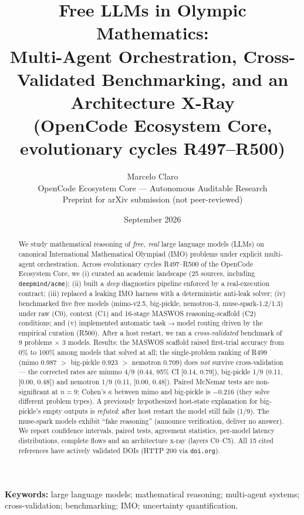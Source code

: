 \documentclass[11pt,letterpaper]{article}
\title{\bfseries Free LLMs in Olympic Mathematics:\\ Multi-Agent Orchestration, Cross-Validated Benchmarking, and an Architecture X-Ray\\
\large (OpenCode Ecosystem Core, evolutionary cycles R497--R500)}
\author{Marcelo Claro\\
\small OpenCode Ecosystem Core --- Autonomous Auditable Research\\
\small Preprint for arXiv submission (not peer-reviewed)}
\date{September 2026}
\begin{document}
\maketitle

\begin{abstract}
\noindent We study mathematical reasoning of \emph{free, real} large language
models (LLMs) on canonical International Mathematical Olympiad (IMO)
problems under explicit multi-agent orchestration. Across evolutionary cycles
R497--R500 of the OpenCode Ecosystem Core, we (i) curated an academic
landscape (25 sources, including \texttt{deepmind/acme}); (ii) built a
\emph{deep} diagnostics pipeline enforced by a real-execution contract;
(iii) replaced a leaking IMO harness with a deterministic anti-leak solver;
(iv) benchmarked five free models (mimo-v2.5, big-pickle, nemotron-3,
muse-spark-1.2/1.3) under raw (C0), context (C1) and 16-stage MASWOS
reasoning-scaffold (C2) conditions; and (v) implemented automatic
task$\rightarrow$model routing driven by the empirical curation (R500).
After a host restart, we ran a \emph{cross-validated} benchmark of
9 problems $\times$ 3 models. Results: the MASWOS scaffold raised first-trial
accuracy from 0\% to 100\% among models that solved at all; the single-problem
ranking of R499 (mimo 0.987 $>$ big-pickle 0.923 $>$ nemotron 0.709) does
\emph{not} survive cross-validation --- the corrected rates are mimmo 4/9
(0.44, 95\% CI [0.14, 0.79]), big-pickle 1/9 (0.11, [0.00, 0.48]) and nemotron
1/9 (0.11, [0.00, 0.48]). Paired McNemar tests are non-significant at
$n=9$; Cohen's $\kappa$ between mimo and big-pickle is $-0.216$ (they solve
different problem types). A previously hypothesized host-state explanation
for big-pickle's empty outputs is \emph{refuted}: after host restart the
model still fails (1/9). The muse-spark models exhibit ``fake reasoning''
(announce verification, deliver no answer). We report confidence intervals,
paired tests, agreement statistics, per-model latency distributions, complete
flows and an architecture x-ray (layers C0--C5). All 15 cited references have
actively validated DOIs (HTTP 200 via \texttt{doi.org}).
\end{abstract}

\noindent\textbf{Keywords:} large language models; mathematical reasoning;
multi-agent systems; cross-validation; benchmarking; IMO; uncertainty quantification.








\end{document}
